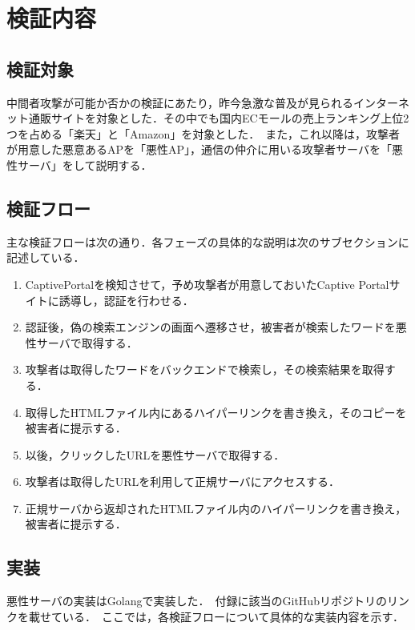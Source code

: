 \documentclass[dvipdfmx]{jsarticle}
\begin{document}
    \section{検証内容}
        \subsection{検証対象}
            中間者攻撃が可能か否かの検証にあたり，昨今急激な普及が見られるインターネット通販サイトを対象とした．その中でも国内ECモールの売上ランキング上位2つを占める「楽天」と「Amazon」を対象とした．\
            また，これ以降は，攻撃者が用意した悪意あるAPを「悪性AP」，通信の仲介に用いる攻撃者サーバを「悪性サーバ」をして説明する．
        \subsection{検証フロー}
            主な検証フローは次の通り．各フェーズの具体的な説明は次のサブセクションに記述している．
            \begin{enumerate}
                \item CaptivePortalを検知させて，予め攻撃者が用意しておいたCaptive Portalサイトに誘導し，認証を行わせる．
                \item 認証後，偽の検索エンジンの画面へ遷移させ，被害者が検索したワードを悪性サーバで取得する．
                \item 攻撃者は取得したワードをバックエンドで検索し，その検索結果を取得する．
                \item 取得したHTMLファイル内にあるハイパーリンクを書き換え，そのコピーを被害者に提示する．
                \item 以後，クリックしたURLを悪性サーバで取得する．
                \item 攻撃者は取得したURLを利用して正規サーバにアクセスする．
                \item 正規サーバから返却されたHTMLファイル内のハイパーリンクを書き換え，被害者に提示する．
            \end{enumerate}
        \subsection{実装}
            悪性サーバの実装はGolangで実装した．\
            付録に該当のGitHubリポジトリのリンクを載せている．\
            ここでは，各検証フローについて具体的な実装内容を示す．\
\end{document}
